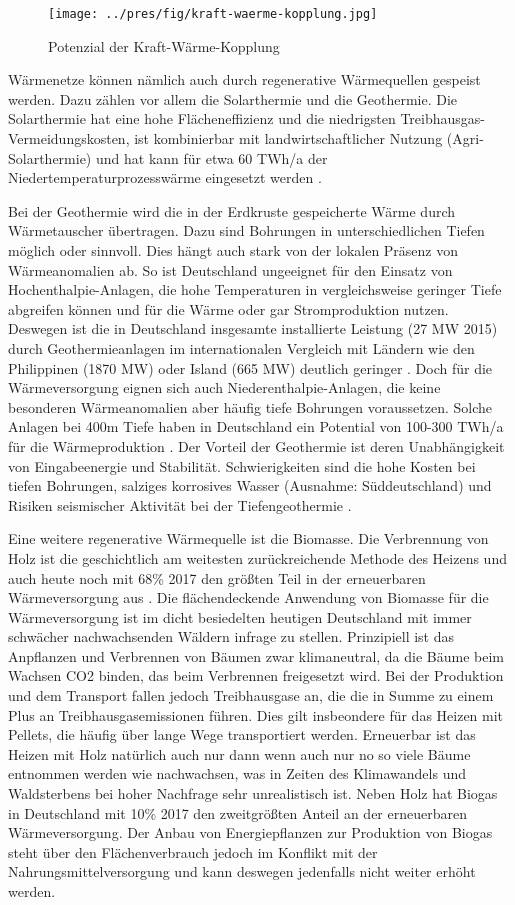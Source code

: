 \begin{figure}
\centering
\texttt{[image: ../pres/fig/kraft-waerme-kopplung.jpg]}
\caption{Potenzial der Kraft-Wärme-Kopplung \cite{kwk}}
\label{fig:kraft-waerme-kopplung}
\end{figure}

Wärmenetze können nämlich auch durch regenerative Wärmequellen gespeist werden.
Dazu zählen vor allem die Solarthermie und die Geothermie. Die Solarthermie hat eine hohe Flächeneffizienz und die niedrigsten Treibhausgas-Vermeidungskosten, ist kombinierbar mit landwirtschaftlicher Nutzung (Agri-Solarthermie) und hat kann für etwa 60 TWh/a der Niedertemperaturprozesswärme eingesetzt werden \cite{clausen2022}. 

Bei der Geothermie wird die in der Erdkruste gespeicherte Wärme durch Wärmetauscher übertragen. Dazu sind Bohrungen in unterschiedlichen Tiefen möglich oder sinnvoll. Dies hängt auch stark von der lokalen Präsenz von Wärmeanomalien ab. So ist Deutschland ungeeignet für den Einsatz von Hochenthalpie-Anlagen, die hohe Temperaturen in vergleichsweise geringer Tiefe abgreifen können und für die Wärme oder gar Stromproduktion nutzen. Deswegen ist die in Deutschland insgesamte installierte Leistung (27 MW 2015) durch Geothermieanlagen im internationalen Vergleich mit Ländern wie den Philippinen (1870 MW) oder Island (665 MW) deutlich geringer \cite{ei1}. Doch für die Wärmeversorgung eignen sich auch Niederenthalpie-Anlagen, die keine besonderen Wärmeanomalien aber häufig tiefe Bohrungen voraussetzen. Solche Anlagen bei 400m Tiefe haben in Deutschland ein Potential von 100-300 TWh/a für die Wärmeproduktion \cite{clausen2022}.
Der Vorteil der Geothermie ist deren Unabhängigkeit von Eingabeenergie und Stabilität. Schwierigkeiten sind die hohe Kosten bei tiefen Bohrungen, salziges korrosives Wasser (Ausnahme: Süddeutschland) und Risiken seismischer Aktivität bei der Tiefengeothermie \cite{ei1}.

Eine weitere regenerative Wärmequelle ist die Biomasse. Die Verbrennung von Holz ist die geschichtlich am weitesten zurückreichende Methode des Heizens und auch heute noch mit 68\% 2017 den größten Teil in der erneuerbaren Wärmeversorgung aus \cite{ei1}. Die flächendeckende Anwendung von Biomasse für die Wärmeversorgung ist im dicht besiedelten heutigen Deutschland mit immer schwächer nachwachsenden Wäldern infrage zu stellen. Prinzipiell ist das Anpflanzen und Verbrennen von Bäumen zwar klimaneutral, da die Bäume beim Wachsen CO2 binden, das beim Verbrennen freigesetzt wird. Bei der Produktion und dem Transport fallen jedoch Treibhausgase an, die die in Summe zu einem Plus an Treibhausgasemissionen führen.
Dies gilt insbeondere für das Heizen mit Pellets, die häufig über lange Wege transportiert werden.
Erneuerbar ist das Heizen mit Holz natürlich auch nur dann wenn auch nur no so viele Bäume entnommen werden wie nachwachsen, was in Zeiten des Klimawandels und Waldsterbens bei hoher Nachfrage sehr unrealistisch ist.
Neben Holz hat Biogas in Deutschland mit 10\% 2017 den zweitgrößten Anteil an der erneuerbaren Wärmeversorgung. Der Anbau von Energiepflanzen zur Produktion von Biogas steht über den Flächenverbrauch jedoch im Konflikt mit der Nahrungsmittelversorgung und kann deswegen jedenfalls nicht weiter erhöht werden.

